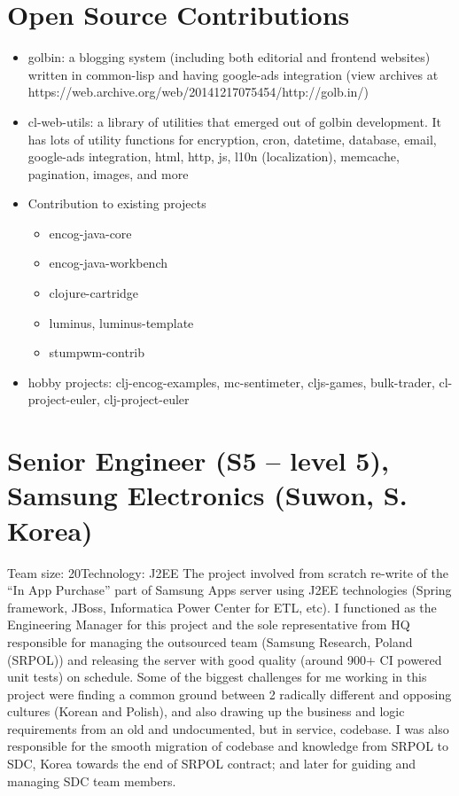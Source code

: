 \documentclass[11pt,a4paper,sans]{moderncv} %
\begin{document}
\section{Open Source Contributions}
         {\begin{itemize}
           \item golbin: a blogging system (including both editorial and frontend websites) written in common-lisp and having google-ads integration (view archives at https://web.archive.org/web/20141217075454/http://golb.in/)
           \item cl-web-utils: a library of utilities that emerged out of golbin development. It has lots of utility functions for encryption, cron, datetime, database, email, google-ads integration, html, http, js, l10n (localization), memcache, pagination, images, and more
           \item Contribution to existing projects
             \begin{itemize}
             \item encog-java-core
             \item encog-java-workbench
             \item clojure-cartridge
             \item luminus, luminus-template
             \item stumpwm-contrib
             \end{itemize}
           \item hobby projects: clj-encog-examples, mc-sentimeter, cljs-games, bulk-trader, cl-project-euler, clj-project-euler
         \end{itemize}}

\newpage{}
\section{Senior Engineer (S5 -- level 5), Samsung Electronics (Suwon, S. Korea)}
         {Team size: 20}{Technology: J2EE}
         {The project involved from scratch re-write of the ``In App Purchase'' part of Samsung Apps server using J2EE technologies (Spring framework, JBoss, Informatica Power Center for ETL, etc). I functioned as the Engineering Manager for this project and the sole representative from HQ responsible for managing the outsourced team (Samsung Research, Poland (SRPOL)) and releasing the server with good quality (around 900+ CI powered unit tests) on schedule. Some of the biggest challenges for me working in this project were finding a common ground between 2 radically different and opposing cultures (Korean and Polish), and also drawing up the business and logic requirements from an old and undocumented, but in service, codebase. I was also responsible for the smooth migration of codebase and knowledge from SRPOL to SDC, Korea towards the end of SRPOL contract; and later for guiding and managing SDC team members.}
\end{document}

